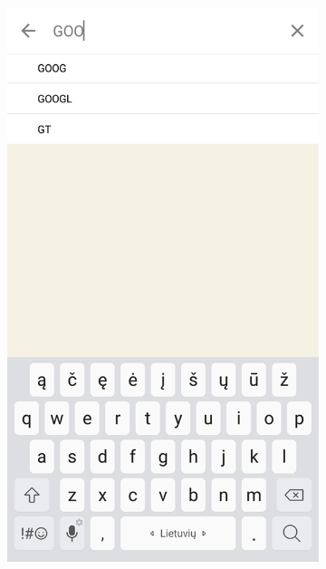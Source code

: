 \documentclass[a4paper,12pt,fleqn]{article}
\begin{document}
\begin{appendices}
\begin{figure}[t!]
\begin{subfigure}{0.5\textwidth}
		\includegraphics[width=0.7\linewidth]{stockSearch.png}
		\label{app:priedas6}
	\end{subfigure}
\end{figure}


\end{appendices}
\end{document}
